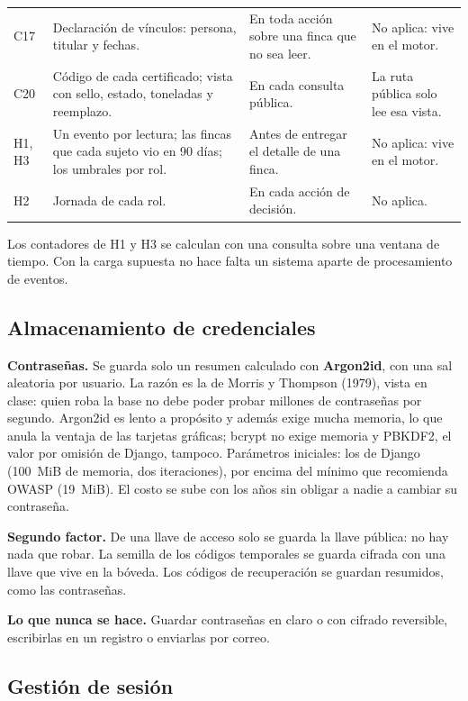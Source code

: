 \documentclass[11pt,letterpaper]{article}
\begin{document}
{\begin{longtable}{@{}L{1.9cm} L{5.4cm} L{3.6cm} L{4.6cm}@{}}
C17 & Declaración de vínculos: persona, titular y fechas. & En toda acción sobre una finca que no sea leer. & No aplica: vive en el motor. \\
C20 & Código de cada certificado; vista con sello, estado, toneladas y reemplazo. & En cada consulta pública. & La ruta pública solo lee esa vista. \\
H1, H3 & Un evento por lectura; las fincas que cada sujeto vio en 90 días; los umbrales por rol. & Antes de entregar el detalle de una finca. & No aplica: vive en el motor. \\
H2 & Jornada de cada rol. & En cada acción de decisión. & No aplica. \\
\end{longtable}
}

Los contadores de H1 y H3 se calculan con una consulta sobre una ventana de tiempo. Con la carga
supuesta no hace falta un sistema aparte de procesamiento de eventos.

\subsection{Almacenamiento de credenciales}
\label{sec:credenciales}

\textbf{Contraseñas.} Se guarda solo un resumen calculado con \textbf{Argon2id}, con una sal aleatoria por
usuario. La razón es la de Morris y Thompson (1979), vista en clase: quien roba la base no debe poder
probar millones de contraseñas por segundo. Argon2id es lento a propósito y además exige mucha
memoria, lo que anula la ventaja de las tarjetas gráficas; bcrypt no exige memoria y PBKDF2, el valor
por omisión de Django, tampoco. Parámetros iniciales: los de Django (100~MiB de memoria, dos
iteraciones), por encima del mínimo que recomienda OWASP (19~MiB). El costo se sube con los años sin
obligar a nadie a cambiar su contraseña.

\textbf{Segundo factor.} De una llave de acceso solo se guarda la llave pública: no hay nada que robar.
La semilla de los códigos temporales se guarda cifrada con una llave que vive en la bóveda. Los códigos
de recuperación se guardan resumidos, como las contraseñas.

\textbf{Lo que nunca se hace.} Guardar contraseñas en claro o con cifrado reversible, escribirlas en un
registro o enviarlas por correo.

\subsection{Gestión de sesión}
\end{document}
